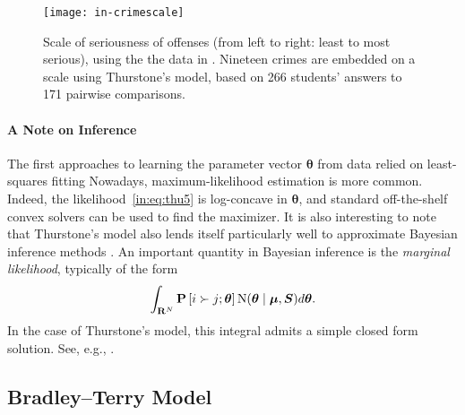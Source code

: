 \begin{figure}[ht]
\centering
\texttt{[image: in-crimescale]}
\caption{
Scale of seriousness of offenses (from left to right: least to most serious), using the the data in \citet{thurstone1927method}.
Nineteen crimes are embedded on a scale using Thurstone's model, based on 266 students' answers to 171 pairwise comparisons.
}
\label{in:fig:crimescale}
\end{figure}


\paragraph{A Note on Inference}
The first approaches to learning the parameter vector $\bm{\theta}$ from data relied on least-squares fitting \citep{thurstone1927method, mosteller1951remarks}
Nowadays, maximum-likelihood estimation is more common.
Indeed, the likelihood~\eqref{in:eq:thu5} is log-concave in $\bm{\theta}$, and standard off-the-shelf convex solvers can be used to find the maximizer.
It is also interesting to note that Thurstone's model also lends itself particularly well to approximate Bayesian inference methods \citep{chu2005extensions, chu2005preference}.
An important quantity in Bayesian inference is the \emph{marginal likelihood}, typically of the form
\begin{align*}
\int_{\mathbf{R}^N} \mathbf{P}\left[ i \succ j ; \bm{\theta} \right] \mathrm{N}( \bm{\theta} \mid \bm{\mu}, \bm{S} ) d\bm{\theta}.
\end{align*}
In the case of Thurstone's model, this integral admits a simple closed form solution. See, e.g., \citet[Section~3.9]{rasmussen2006gaussian}.


\subsection{Bradley--Terry Model}

